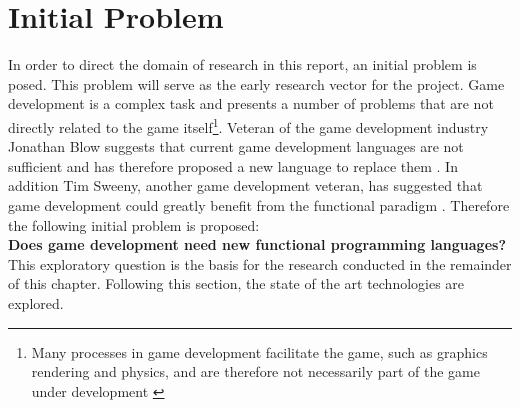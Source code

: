 \section{Initial Problem}
In order to direct the domain of research in this report, an initial problem is posed. This problem will serve as the early research vector for the project. Game development is a complex task and presents a number of problems that are not directly related to the game itself\footnote{Many processes in game development facilitate the game, such as graphics rendering and physics, and are therefore not necessarily part of the game under development \cite{blow2004game}}. Veteran of the game development industry Jonathan Blow suggests that current game development languages are not sufficient and has therefore proposed a new language to replace them \cite{blowProgrammingLanguage}. In addition Tim Sweeny, another game development veteran, has suggested that game development could greatly benefit from the functional paradigm \cite{theNextMainstreanProgrammingLanguage}. Therefore the following initial problem is proposed:\\

\textbf{Does game development need new functional programming languages?}\\


This exploratory question is the basis for the research conducted in the remainder of this chapter. Following this section, the state of the art technologies are explored.